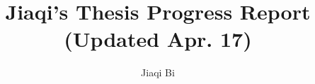 \documentclass[preprint,12pt]{elsarticle}
\begin{document}
\begin{frontmatter}


\title{Jiaqi's Thesis Progress Report (Updated Apr. 17)}




\author[rvt]{Jiaqi Bi}

\address[rvt]{Western University, \\ Schulich School of Medicine \& Dentistry, \\ Department of Epidemiology and Biostatistics}





\end{frontmatter}
\end{document}
